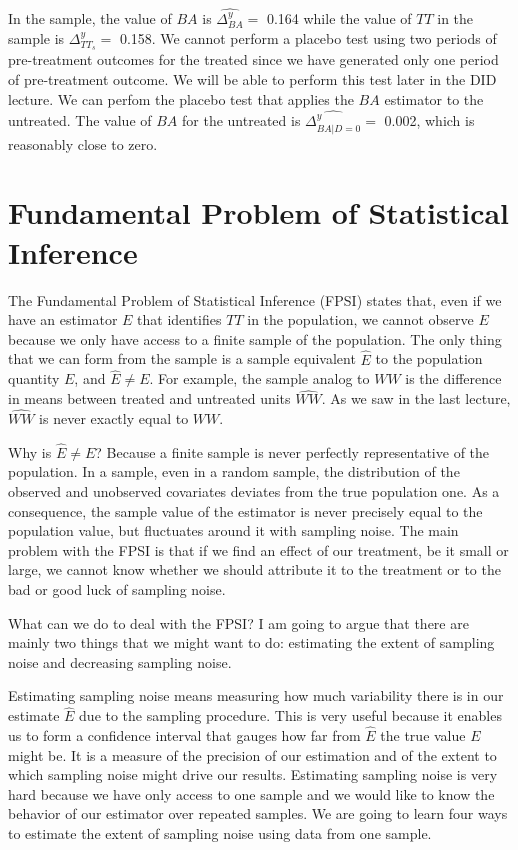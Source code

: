 \documentclass[]{book}
\theoremstyle{definition}
\theoremstyle{definition}
\theoremstyle{definition}
\theoremstyle{remark}
\begin{document}
In the sample, the value of \(BA\) is \(\hat{\Delta^y_{BA}}=\) 0.164 while the value of \(TT\) in the sample is \(\Delta^y_{TT_s}=\) 0.158.
We cannot perform a placebo test using two periods of pre-treatment outcomes for the treated since we have generated only one period of pre-treatment outcome.
We will be able to perform this test later in the DID lecture.
We can perfom the placebo test that applies the \(BA\) estimator to the untreated.
The value of \(BA\) for the untreated is \(\hat{\Delta^y_{BA|D=0}}=\) 0.002, which is reasonably close to zero.

\hypertarget{FPSI}{%
\chapter{Fundamental Problem of Statistical Inference}\label{FPSI}}

The Fundamental Problem of Statistical Inference (FPSI) states that, even if we have an estimator \(E\) that identifies \(TT\) in the population, we cannot observe \(E\) because we only have access to a finite sample of the population.
The only thing that we can form from the sample is a sample equivalent \(\hat{E}\) to the population quantity \(E\), and \(\hat{E}\neq E\).
For example, the sample analog to \(WW\) is the difference in means between treated and untreated units \(\hat{WW}\).
As we saw in the last lecture, \(\hat{WW}\) is never exactly equal to \(WW\).

Why is \(\hat{E}\neq E\)?
Because a finite sample is never perfectly representative of the population.
In a sample, even in a random sample, the distribution of the observed and unobserved covariates deviates from the true population one.
As a consequence, the sample value of the estimator is never precisely equal to the population value, but fluctuates around it with sampling noise.
The main problem with the FPSI is that if we find an effect of our treatment, be it small or large, we cannot know whether we should attribute it to the treatment or to the bad or good luck of sampling noise.

What can we do to deal with the FPSI?
I am going to argue that there are mainly two things that we might want to do: estimating the extent of sampling noise and decreasing sampling noise.

Estimating sampling noise means measuring how much variability there is in our estimate \(\hat{E}\) due to the sampling procedure.
This is very useful because it enables us to form a confidence interval that gauges how far from \(\hat{E}\) the true value \(E\) might be.
It is a measure of the precision of our estimation and of the extent to which sampling noise might drive our results.
Estimating sampling noise is very hard because we have only access to one sample and we would like to know the behavior of our estimator over repeated samples.
We are going to learn four ways to estimate the extent of sampling noise using data from one sample.
\end{document}
